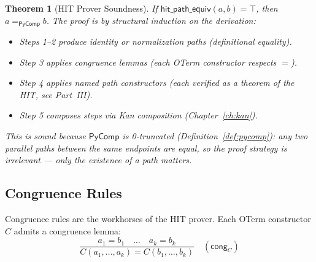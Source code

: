 \documentclass[11pt,a4paper]{report}
\theoremstyle{definition}
\theoremstyle{plain}
\newtheorem{theorem}[definition]{Theorem}
\begin{document}
\begin{theorem}[HIT Prover Soundness]
\label{thm:hit-soundness}
If $\mathsf{hit\_path\_equiv}(a,b) = \top$, then
$a =_{\mathsf{PyComp}} b$.  The proof is by structural induction
on the derivation:
\begin{itemize}
  \item Steps 1--2 produce identity or normalization paths
    (definitional equality).
  \item Step 3 applies congruence lemmas (each OTerm constructor
    respects $=$).
  \item Step 4 applies named path constructors (each verified as
    a theorem of the HIT, see Part~III).
  \item Step 5 composes steps via Kan composition
    (Chapter~\ref{ch:kan}).
\end{itemize}
This is sound because $\mathsf{PyComp}$ is 0-truncated
(Definition~\ref{def:pycomp}): any two parallel paths between
the same endpoints are equal, so the proof strategy is irrelevant
--- only the existence of a path matters.
\end{theorem}

\subsection{Congruence Rules}
\label{sec:congruence-rules}

Congruence rules are the workhorses of the HIT prover.  Each OTerm
constructor $C$ admits a congruence lemma:
\[
  \frac{a_1 = b_1 \quad \ldots \quad a_k = b_k}
       {C(a_1, \ldots, a_k) = C(b_1, \ldots, b_k)}
  \quad (\mathsf{cong}_C)
\]
\end{document}
